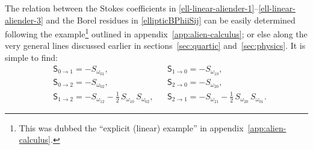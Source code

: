 \documentclass[11pt,a4paper]{article}
\begin{document}
The relation between the Stokes coefficients in \eqref{ell-linear-aliender-1}--\eqref{ell-linear-aliender-3} and the Borel residues in \eqref{ellipticBPhiiSij} can be easily determined following the example\footnote{This was dubbed the ``explicit (linear) example'' in appendix~\ref{app:alien-calculus}.} outlined in appendix~\ref{app:alien-calculus}; or else along the very general lines discussed earlier in sections~\ref{sec:quartic} and~\ref{sec:physics}. It is simple to find:
%
\begin{align}
\label{eq:nonres-Borel-stokes-01}
&\mathsf{S}_{0\to 1} = - S_{\omega_{01}}, 
&&\mathsf{S}_{1\to 0} = - S_{\omega_{10}}, \\
&\mathsf{S}_{0\to 2} = - S_{\omega_{02}}, 
&&\mathsf{S}_{2\to 0} = - S_{\omega_{20}}, \\
&\mathsf{S}_{1\to 2} = - S_{\omega_{12}} - \frac{1}{2}\, S_{\omega_{10}}\,S_{\omega_{02}}, 
&&\mathsf{S}_{2\to 1} = - S_{\omega_{21}} - \frac{1}{2}\, S_{\omega_{20}}\,S_{\omega_{01}}.
\label{eq:nonres-Borel-stokes-21}
\end{align}
\end{document}
